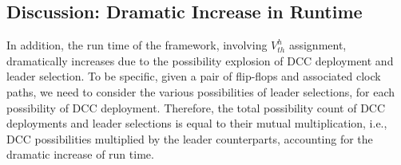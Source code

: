 \subsection{Discussion: Dramatic Increase in Runtime}
In addition, the run time of the framework, involving $V_{th}^h$ assignment, dramatically increases due to the possibility explosion of DCC deployment and leader selection. To be specific, given a pair of flip-flops and associated clock paths, we need to consider the various possibilities of leader selections, for each possibility of DCC deployment. Therefore, the total possibility count of DCC deployments and leader selections is equal to their mutual multiplication, i.e., DCC possibilities multiplied by the leader counterparts, accounting for the dramatic increase of run time.
